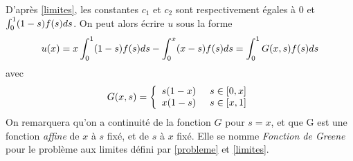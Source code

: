 \documentclass[12pt]{article}
\newcommand{\espace}{\hspace{5mm}}
\begin{document}
D'après \eqref{limites}, les constantes $c_1$ et $c_2$ sont respectivement égales à $0$ et $\int_0^1(1-s)f\relax(s)ds$.  On peut alors écrire $u$ sous la forme
\begin{equation} \label{introGreene}
u\relax(x) = x \int_0^1(1-s)f\relax(s)ds - \int_0^x (x-s)f\relax(s)ds = \int_0^1 G\relax(x, s) f\relax(s) ds
\end{equation}
avec 
\begin{equation}
G\relax(x, s) = \left\{
    \begin{array}{ll}
        s(1-x) \espace s\in [0,x] \\
        x(1-s) \espace s\in [x, 1]
    \end{array}
\right.
\end{equation}
On remarquera qu'on a continuité de la fonction $G$ pour $s = x$, et que G est une fonction \emph{affine} de $x$ à $s$ fixé, et de $s$ à $x$ fixé. Elle se nomme \emph{Fonction de Greene} pour le problème aux limites défini par \eqref{probleme} et \eqref{limites}.
\end{document}
